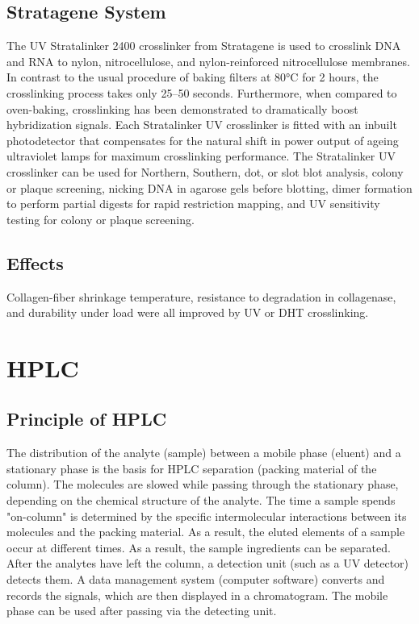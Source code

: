 \documentclass[12pt]{article}
\begin{document}
\subsection{Stratagene System}

The UV Stratalinker 2400 crosslinker from Stratagene is used to crosslink DNA and RNA to nylon, nitrocellulose, and nylon-reinforced nitrocellulose membranes. In contrast to the usual procedure of baking filters at 80°C for 2 hours, the crosslinking process takes only 25–50 seconds. Furthermore, when compared to oven-baking, crosslinking has been demonstrated to dramatically boost hybridization signals. Each Stratalinker UV crosslinker is fitted with an inbuilt photodetector that compensates for the natural shift in power output of ageing ultraviolet lamps for maximum crosslinking performance. The Stratalinker UV crosslinker can be used for Northern, Southern, dot, or slot blot analysis, colony or plaque screening, nicking DNA in agarose gels before blotting, dimer formation to perform partial digests for rapid restriction mapping, and UV sensitivity testing for colony or plaque screening.

\subsection{Effects}

Collagen-fiber shrinkage temperature, resistance to degradation in collagenase, and durability under load were all improved by UV or DHT crosslinking.


\clearpage


\section{HPLC}

\subsection{Principle of HPLC}

The distribution of the analyte (sample) between a mobile phase (eluent) and a stationary phase is the basis for HPLC separation (packing material of the column). The molecules are slowed while passing through the stationary phase, depending on the chemical structure of the analyte. The time a sample spends "on-column" is determined by the specific intermolecular interactions between its molecules and the packing material. As a result, the eluted elements of a sample occur at different times. As a result, the sample ingredients can be separated.
After the analytes have left the column, a detection unit (such as a UV detector) detects them. A data management system (computer software) converts and records the signals, which are then displayed in a chromatogram. The mobile phase can be used after passing via the detecting unit.
\end{document}
